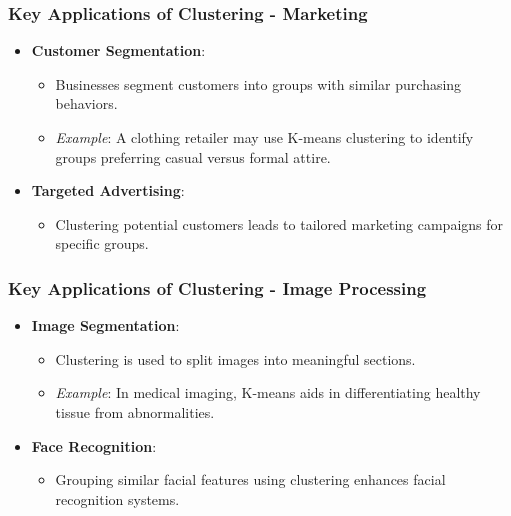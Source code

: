 \documentclass[aspectratio=169]{beamer}
\begin{document}
\begin{frame}[fragile]
    \frametitle{Key Applications of Clustering - Marketing}
    \begin{itemize}
        \item \textbf{Customer Segmentation}: 
        \begin{itemize}
            \item Businesses segment customers into groups with similar purchasing behaviors.
            \item \textit{Example}: A clothing retailer may use K-means clustering to identify groups preferring casual versus formal attire.
        \end{itemize}
        \item \textbf{Targeted Advertising}:
        \begin{itemize}
            \item Clustering potential customers leads to tailored marketing campaigns for specific groups.
        \end{itemize}
    \end{itemize}
\end{frame}

\begin{frame}[fragile]
    \frametitle{Key Applications of Clustering - Image Processing}
    \begin{itemize}
        \item \textbf{Image Segmentation}:
        \begin{itemize}
            \item Clustering is used to split images into meaningful sections. 
            \item \textit{Example}: In medical imaging, K-means aids in differentiating healthy tissue from abnormalities.
        \end{itemize}
        \item \textbf{Face Recognition}:
        \begin{itemize}
            \item Grouping similar facial features using clustering enhances facial recognition systems.
        \end{itemize}
    \end{itemize}
\end{frame}
\end{document}
